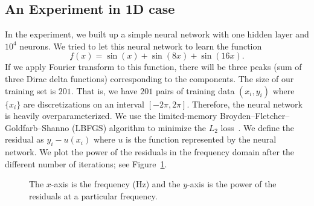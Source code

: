 \documentclass[letterpaper,12pt]{article}
\begin{document}
\subsection{An Experiment in 1D case}
In the experiment, we built up a simple neural network with one hidden layer and $10^4$ neurons. We tried to let this neural network to learn the function 
\begin{equation}
    f(x) =\sin(x)+\sin(8x)+\sin(16x).
\end{equation}
If we apply Fourier transform to this function, there will be three peaks (sum of three Dirac delta functions) corresponding to the components. The size of our training set is $201$. That is, we have $201$ pairs of training data $(x_i,y_i)$ where $\{x_i\}$ are discretizations on an interval $[-2\pi,2\pi]$. Therefore, the neural network is heavily overparameterized. We use the limited-memory Broyden--Fletcher--Goldfarb--Shanno (LBFGS) algorithm to minimize the $L_2$ loss~\cite{nocedal2006numerical}. We define the residual as $y_i - u(x_i)$ where $u$ is the function represented by the neural network. We plot the power of the residuals in the frequency domain after the different number of iterations; see Figure~\ref{fig:4}.

\begin{figure}
\centering
{}%
%
\caption{The $x$-axis is the frequency (Hz) and the $y$-axis is the power of the residuals at a particular frequency.}\label{fig:4}
\end{figure}
\end{document}
